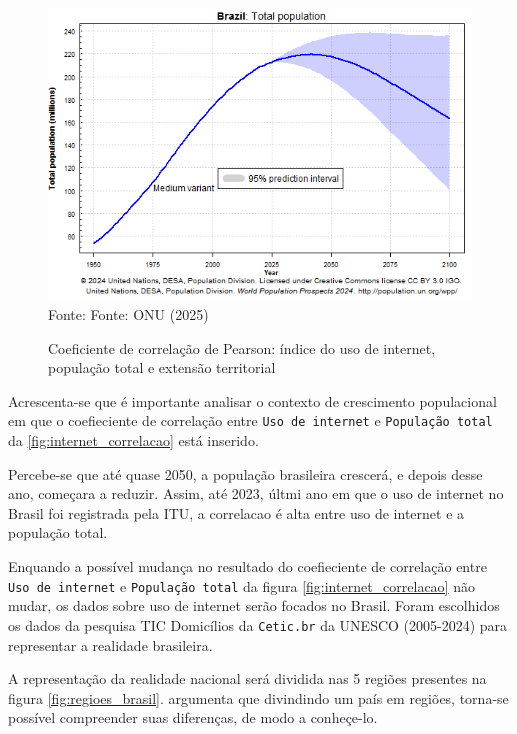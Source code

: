 \begin{figure}[ht]
    \centering
    \caption{Coeficiente de correlação de Pearson: índice do uso de internet, população total e extensão territorial}
    \includegraphics[width=1\linewidth]{figuras/populacao/populacao_brasil.png}
    \label{fig:populacao_brasil}
    \footnotesize{Fonte: Fonte: ONU (2025)}
\end{figure}

\newpage
Acrescenta-se que é importante analisar o contexto de crescimento populacional em que o coefieciente de correlação entre \texttt{Uso de internet} e \texttt{População total} da \ref{fig:internet_correlacao} está inserido. 

Percebe-se que até quase 2050, a população brasileira crescerá, e depois desse ano, começara a reduzir. Assim, até 2023, últmi ano em que o uso de internet no Brasil foi registrada pela ITU, a correlacao é alta entre uso de internet e a população total.

Enquando a possível mudança no resultado do coefieciente de correlação entre \texttt{Uso de internet} e \texttt{População total} da figura \ref{fig:internet_correlacao} não mudar, os dados sobre uso de internet serão focados no Brasil. Foram escolhidos os dados da pesquisa TIC Domicílios da \texttt{Cetic.br} da UNESCO (2005-2024) para representar a realidade brasileira. 

A representação da realidade nacional será dividida nas 5 regiões presentes na figura \ref{fig:regioes_brasil}. \cite{HAMAM_Cinco_2017} argumenta que divindindo um país em regiões, torna-se possível compreender suas diferenças, de modo a conheçe-lo.

